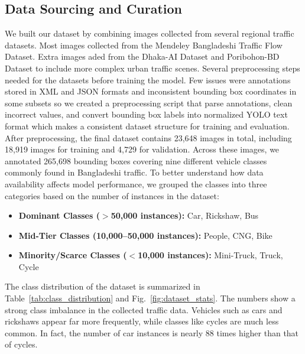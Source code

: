 \documentclass[sigconf]{acmart}
\begin{document}
\subsection{Data Sourcing and Curation}
We built our dataset by combining images collected from several regional traffic datasets. Most images collected from the Mendeley Bangladeshi Traffic Flow Dataset\cite{Islam2025BangladeshiTrafficFlow}. Extra images aded from the Dhaka-AI Dataset\cite{DVN/POREXF_2020} and Poribohon-BD Dataset\cite{19} to include more complex urban traffic scenes. Several preprocessing steps needed for the datasets before training the model. Few issues were annotations stored in XML and JSON formats and inconsistent bounding box coordinates in some subsets so we created a preprocessing script that parse annotations, clean incorrect values, and convert bounding box labels into normalized YOLO text format which makes a consistent dataset structure for training and evaluation. After preprocessing, the final dataset contains 23,648 images in total, including 18,919 images for training and 4,729 for validation. Across these images, we annotated 265,698 bounding boxes covering nine different vehicle classes commonly found in Bangladeshi traffic. To better understand how data availability affects model performance, we grouped the classes into three categories based on the number of instances in the dataset:

\begin{itemize}
    \item \textbf{Dominant Classes ($>$50,000 instances):} Car, Rickshaw, Bus
    \item \textbf{Mid-Tier Classes (10,000--50,000 instances):} People, CNG, Bike
    \item \textbf{Minority/Scarce Classes ($<$10,000 instances):} Mini-Truck, Truck, Cycle
\end{itemize}


The class distribution of the dataset is summarized in Table~\ref{tab:class_distribution} and Fig.~\ref{fig:dataset_stats}. The numbers show a strong class imbalance in the collected traffic data. Vehicles such as cars and rickshaws appear far more frequently, while classes like cycles are much less common. In fact, the number of car instances is nearly 88 times higher than that of cycles.
\end{document}
